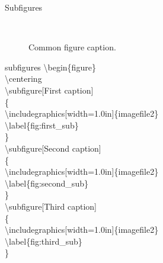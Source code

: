 \documentclass{beamer}
\begin{document}
\begin{frame}{Subfigures}
\begin{figure}
    \centering
    \\
    \caption{Common figure caption.}
    \label{fig:sample_subfigures}
\end{figure}
\end{frame}

\begin{frame}{subfigures}
\textbackslash begin\{figure\}\\
\hspace{0.5cm}\textbackslash centering\\
\hspace{0.5cm}\textbackslash subfigure[First caption]\\
\hspace{0.5cm}\{\\
\hspace{1cm}\textbackslash includegraphics[width=1.0in]\{imagefile2\}\\
\hspace{1cm}\textbackslash label\{fig:first\_sub\}\\
\hspace{0.5cm}\}\\
\hspace{0.5cm}\textbackslash subfigure[Second caption]\\
\hspace{0.5cm}\{\\
\hspace{1cm}\textbackslash includegraphics[width=1.0in]\{imagefile2\}\\
\hspace{1cm}\textbackslash label\{fig:second\_sub\}\\
\hspace{0.5cm}\}\\
\hspace{0.5cm}\textbackslash subfigure[Third caption]\\
\hspace{0.5cm}\{\\
\hspace{1cm}\textbackslash includegraphics[width=1.0in]\{imagefile2\}\\
\hspace{1cm}\textbackslash label\{fig:third\_sub\}\\
\hspace{0.5cm}\}\\

\end{frame}
\end{document}
